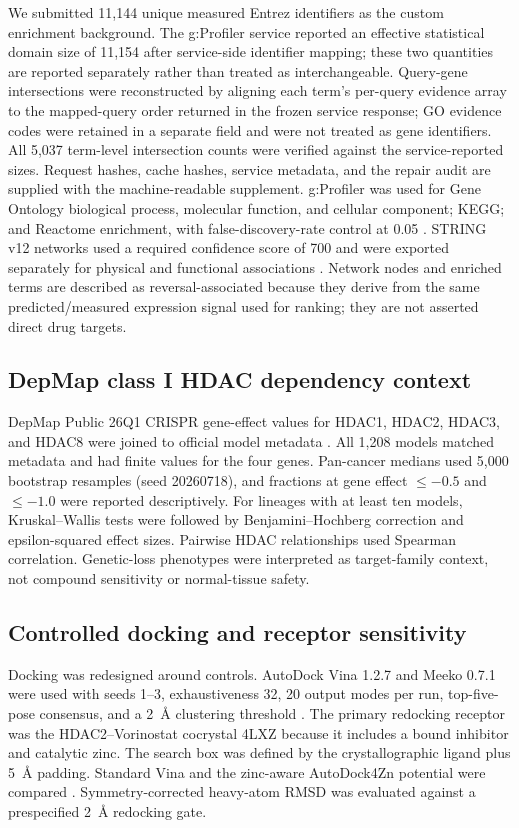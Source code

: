 We submitted 11,144 unique measured Entrez identifiers as the custom enrichment background. The g:Profiler service reported an effective statistical domain size of 11,154 after service-side identifier mapping; these two quantities are reported separately rather than treated as interchangeable. Query-gene intersections were reconstructed by aligning each term's per-query evidence array to the mapped-query order returned in the frozen service response; GO evidence codes were retained in a separate field and were not treated as gene identifiers. All 5,037 term-level intersection counts were verified against the service-reported sizes. Request hashes, cache hashes, service metadata, and the repair audit are supplied with the machine-readable supplement. g:Profiler was used for Gene Ontology biological process, molecular function, and cellular component; KEGG; and Reactome enrichment, with false-discovery-rate control at 0.05 \cite{kolberg2023}. STRING v12 networks used a required confidence score of 700 and were exported separately for physical and functional associations \cite{szklarczyk2023}. Network nodes and enriched terms are described as reversal-associated because they derive from the same predicted/measured expression signal used for ranking; they are not asserted direct drug targets.

\subsection{DepMap class I HDAC dependency context}

DepMap Public 26Q1 CRISPR gene-effect values for HDAC1, HDAC2, HDAC3, and HDAC8 were joined to official model metadata \cite{tsherniak2017}. All 1,208 models matched metadata and had finite values for the four genes. Pan-cancer medians used 5,000 bootstrap resamples (seed 20260718), and fractions at gene effect $\leq-0.5$ and $\leq-1.0$ were reported descriptively. For lineages with at least ten models, Kruskal--Wallis tests were followed by Benjamini--Hochberg correction and epsilon-squared effect sizes. Pairwise HDAC relationships used Spearman correlation. Genetic-loss phenotypes were interpreted as target-family context, not compound sensitivity or normal-tissue safety.

\subsection{Controlled docking and receptor sensitivity}

Docking was redesigned around controls. AutoDock Vina 1.2.7 and Meeko 0.7.1 were used with seeds 1--3, exhaustiveness 32, 20 output modes per run, top-five-pose consensus, and a 2~\AA{} clustering threshold \cite{trott2010,eberhardt2021}. The primary redocking receptor was the HDAC2--Vorinostat cocrystal 4LXZ because it includes a bound inhibitor and catalytic zinc. The search box was defined by the crystallographic ligand plus 5~\AA{} padding. Standard Vina and the zinc-aware AutoDock4Zn potential were compared \cite{santosmartins2014}. Symmetry-corrected heavy-atom RMSD was evaluated against a prespecified 2~\AA{} redocking gate.

